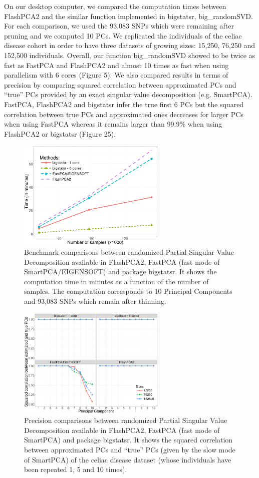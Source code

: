 \documentclass{bioinfo}
\begin{document}
On our desktop computer, we compared the computation times between FlashPCA2 and the similar function implemented in bigstatsr, big\_randomSVD. For each comparison, we used the 93,083 SNPs which were remaining after pruning and we computed 10 PCs. We replicated the individuals of the celiac disease cohort in order to have three datasets of growing sizes: 15,250, 76,250 and 152,500 individuals. Overall, our function big\_randomSVD showed to be twice as fast as FastPCA and FlashPCA2 and almost 10 times as fast when using parallelism with 6 cores (Figure 5). We also compared results in terms of precision by comparing squared correlation between approximated PCs and ``true'' PCs provided by an exact singular value decomposition (e.g. SmartPCA). FastPCA, FlashPCA2 and bigstatsr infer the true first 6 PCs but the squared correlation between true PCs and approximated ones decreases for larger PCs when using FastPCA whereas it remains larger than 99.9\% when using FlashPCA2 or bigstatsr (Figure 25).   

\begin{figure}[!tpb]
\centerline{\includegraphics[width=200pt]{benchmark-pca}}
\caption{Benchmark comparisons between randomized Partial Singular Value Decomposition available in FlashPCA2, FastPCA (fast mode of SmartPCA/EIGENSOFT) and package bigstatsr. It shows the computation time in minutes as a function of the number of samples. The computation corresponds to 10 Principal Components and 93,083 SNPs which remain after thinning.}\label{fig:bench-pca}
\end{figure}

\begin{figure}[!tpb]
\centerline{\includegraphics[width=200pt]{precision-pca}}
\caption{Precision comparisons between randomized Partial Singular Value Decomposition available in FlashPCA2, FastPCA (fast mode of SmartPCA) and package bigstatsr. It shows the squared correlation between approximated PCs and ``true'' PCs (given by the slow mode of SmartPCA) of the celiac disease dataset (whose individuals have been repeated 1, 5 and 10 times).}\label{fig:prec-pca}
\end{figure}
\end{document}
